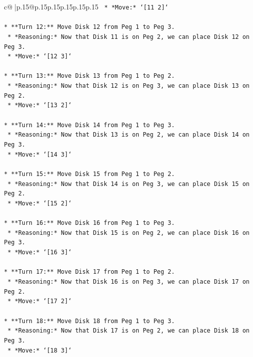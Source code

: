 \documentclass{article}
\begin{document}
{\begin{supertabular}{c@{$\;$}|p{.15\linewidth}@{}p{.15\linewidth}p{.15\linewidth}p{.15\linewidth}p{.15\linewidth}p{.15\linewidth}}
{{{\texttt{    *   *Move:* `{[}11 2{]}`} \\
\\ 
\texttt{*   **Turn 12:** Move Disk 12 from Peg 1 to Peg 3.} \\
\texttt{    *   *Reasoning:* Now that Disk 11 is on Peg 2, we can place Disk 12 on Peg 3.} \\
\texttt{    *   *Move:* `{[}12 3{]}`} \\
\\ 
\texttt{*   **Turn 13:** Move Disk 13 from Peg 1 to Peg 2.} \\
\texttt{    *   *Reasoning:* Now that Disk 12 is on Peg 3, we can place Disk 13 on Peg 2.} \\
\texttt{    *   *Move:* `{[}13 2{]}`} \\
\\ 
\texttt{*   **Turn 14:** Move Disk 14 from Peg 1 to Peg 3.} \\
\texttt{    *   *Reasoning:* Now that Disk 13 is on Peg 2, we can place Disk 14 on Peg 3.} \\
\texttt{    *   *Move:* `{[}14 3{]}`} \\
\\ 
\texttt{*   **Turn 15:** Move Disk 15 from Peg 1 to Peg 2.} \\
\texttt{    *   *Reasoning:* Now that Disk 14 is on Peg 3, we can place Disk 15 on Peg 2.} \\
\texttt{    *   *Move:* `{[}15 2{]}`} \\
\\ 
\texttt{*   **Turn 16:** Move Disk 16 from Peg 1 to Peg 3.} \\
\texttt{    *   *Reasoning:* Now that Disk 15 is on Peg 2, we can place Disk 16 on Peg 3.} \\
\texttt{    *   *Move:* `{[}16 3{]}`} \\
\\ 
\texttt{*   **Turn 17:** Move Disk 17 from Peg 1 to Peg 2.} \\
\texttt{    *   *Reasoning:* Now that Disk 16 is on Peg 3, we can place Disk 17 on Peg 2.} \\
\texttt{    *   *Move:* `{[}17 2{]}`} \\
\\ 
\texttt{*   **Turn 18:** Move Disk 18 from Peg 1 to Peg 3.} \\
\texttt{    *   *Reasoning:* Now that Disk 17 is on Peg 2, we can place Disk 18 on Peg 3.} \\
\texttt{    *   *Move:* `{[}18 3{]}`} \\
}}}
\end{supertabular}}
\end{document}
